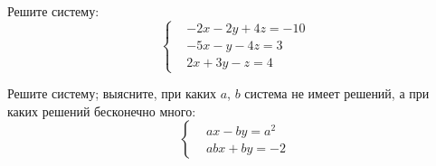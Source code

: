 %
%


\begin{problems}

\item
Решите систему:
\[\left\{\begin{aligned}&
    - 2 x - 2 y + 4 z = - 10
\\&
    - 5 x - y - 4 z = 3
\\&
    2 x + 3 y - z = 4
\end{aligned}\right.\]

\item
Решите систему; выясните, при каких $a$, $b$ система не имеет решений, а при
каких решений бесконечно много:
\[\left\{\begin{aligned}&
    a x - b y = a^2
\\&
    a b x + b y = -2
\end{aligned}\right.\]

\end{problems}

